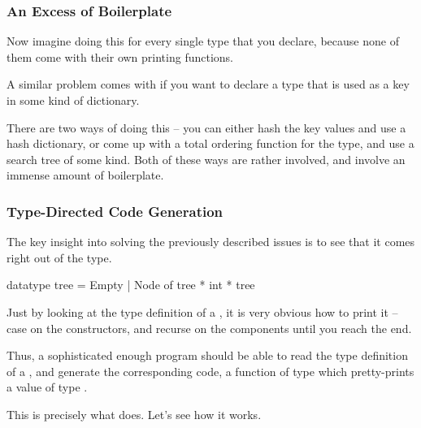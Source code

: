 \documentclass[aspectratio=169, handout]{beamer}
\begin{document}
\begin{frame}[fragile]
  \frametitle{An Excess of Boilerplate}

  Now imagine doing this for every single type that you declare, because none
  of them come with their own printing functions.

  \vspace{\fill}

  A similar problem comes with if you want to declare a type that is used as a
  key in some kind of dictionary.

  \vspace{\fill}

  There are two ways of doing this -- you can either hash the key values and use
  a hash dictionary, or come up with a total ordering function for the type, and
  use a search tree of some kind. Both of these ways are rather involved, and
  involve an immense amount of boilerplate.
\end{frame}

\begin{frame}[fragile]
  \frametitle{Type-Directed Code Generation}

  The key insight into solving the previously described issues is to see that
  it comes right out of the type.

  \vspace{\fill}

  \begin{codeblock}
    datatype tree =
      Empty
    | Node of tree * int * tree
  \end{codeblock}

  \vspace{\fill}

  Just by looking at the type definition of a , it is
  very obvious how to print it -- case on the constructors, and recurse on the
  components until you reach the end.

  \vspace{\fill}

  Thus, a sophisticated enough program should be able to read the type definition
  of a , and generate the corresponding code, a function of type
   which pretty-prints a value of type .

  \vspace{\fill}

  This is precisely what  does. Let's see how it works.
\end{frame}
\end{document}
